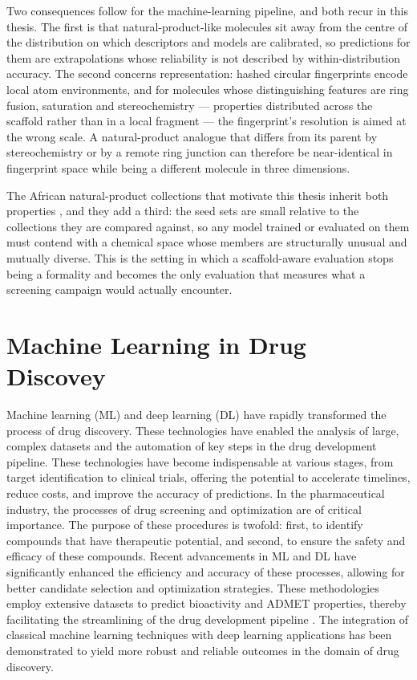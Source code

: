 Two consequences follow for the machine-learning pipeline, and both recur in this thesis. The first is that natural-product-like molecules sit away from the centre of the distribution on which descriptors and models are calibrated, so predictions for them are extrapolations whose reliability is not described by within-distribution accuracy. The second concerns representation: hashed circular fingerprints encode local atom environments, and for molecules whose distinguishing features are ring fusion, saturation and stereochemistry --- properties distributed across the scaffold rather than in a local fragment --- the fingerprint's resolution is aimed at the wrong scale. A natural-product analogue that differs from its parent by stereochemistry or by a remote ring junction can therefore be near-identical in fingerprint space while being a different molecule in three dimensions.

The African natural-product collections that motivate this thesis inherit both properties \cite{AmoaOnguene2013}, and they add a third: the seed sets are small relative to the collections they are compared against, so any model trained or evaluated on them must contend with a chemical space whose members are structurally unusual and mutually diverse. This is the setting in which a scaffold-aware evaluation stops being a formality and becomes the only evaluation that measures what a screening campaign would actually encounter.

\section{Machine Learning in Drug Discovey}
Machine learning (ML) and deep learning (DL) have rapidly transformed the process of drug discovery. These technologies have enabled the analysis of large, complex datasets and the automation of key steps in the drug development pipeline. These technologies have become indispensable at various stages, from target identification to clinical trials, offering the potential to accelerate timelines, reduce costs, and improve the accuracy of predictions. In the pharmaceutical industry, the processes of drug screening and optimization are of critical importance. The purpose of these procedures is twofold: first, to identify compounds that have therapeutic potential, and second, to ensure the safety and efficacy of these compounds. Recent advancements in ML and DL have significantly enhanced the efficiency and accuracy of these processes, allowing for better candidate selection and optimization strategies. These methodologies employ extensive datasets to predict bioactivity and ADMET properties, thereby facilitating the streamlining of the drug development pipeline \cite{Chen2011,Wang2012,Swanson2024,Guan2019}. The integration of classical machine learning techniques with deep learning applications has been demonstrated to yield more robust and reliable outcomes in the domain of drug discovery.

